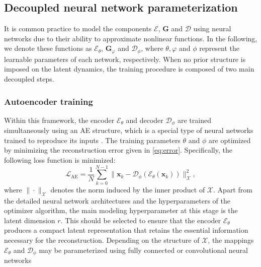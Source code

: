 \documentclass{article}
\begin{document}
\subsection{Decoupled neural network parameterization}
It is common practice to model the components $\mathcal{E}$, $\mathbf{G}$ and $\mathcal{D}$ using neural networks due to their ability to approximate nonlinear functions.
In the following, we denote these functions as $\mathcal{E}_\theta$, $\mathbf{G}_\varphi$ and $\mathcal{D}_\phi$, where $\theta, \varphi$ and $\phi$ represent the learnable parameters of each network, respectively.
When no prior structure is imposed on the latent dynamics, the training procedure is composed of two main decoupled steps.

\subsubsection{Autoencoder training}
Within this framework, the encoder $\mathcal{E}_\theta$ and decoder $\mathcal{D}_\phi$ are trained simultaneously using an AE structure, which is a special type of neural networks trained to reproduce its inputs \citep{rumelhart1985learning}.
The training parameters $\theta$ and $\phi$ are optimized by minimizing the reconstruction error given in \eqref{eq:error}.
Specifically, the following loss function is minimized:
\begin{equation}
    \label{eq:opt-ae-alone}
    \mathcal{L}_{\text{AE}} = \frac{1}{N} \sum_{k=0}^{N-1} \| \mathbf{x}_k - \mathcal{D}_\phi(\mathcal{E}_\theta(\mathbf{x}_k)) \|_{\mathcal{X}}^2,
\end{equation}
where $\|\cdot\|_{\mathcal{X}}$ denotes the norm induced by the inner product of $\mathcal{X}$.
Apart from the detailed neural network architectures and the hyperparameters of the optimizer algorithm, the main modeling hyperparameter at this stage is the latent dimension $r$.
This should be selected to ensure that the encoder $\mathcal{E}_\theta$ produces a compact latent representation that retains the essential information necessary for the reconstruction.
Depending on the structure of $\mathcal{X}$, the mappings $\mathcal{E}_\theta$ and $ \mathcal{D}_\phi$ may be parameterized using fully connected or convolutional neural networks
\end{document}
